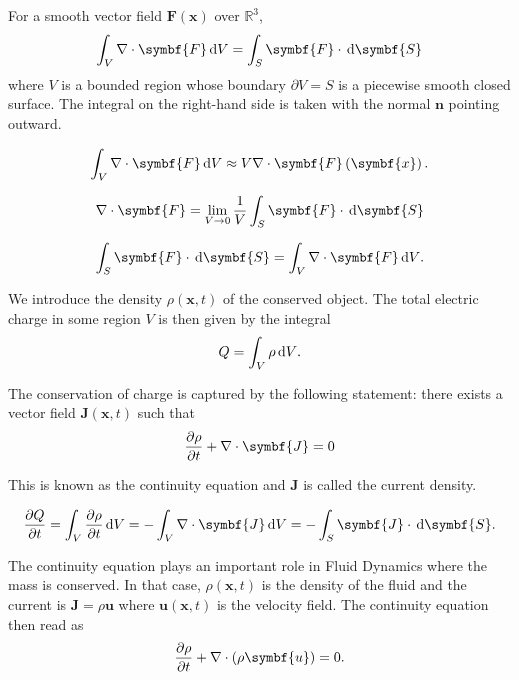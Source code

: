 For a smooth vector field $\symbf{F}\left(\symbf{x}\right)$ over $\mathbb{R}^{3}$,
\begin{equation*}
	\int_{V}\nabla\cdot\symbf{F}\dl V=
	\int_{S}\symbf{F}\cdot\dl{\symbf{S}}
\end{equation*}
where $V$ is a bounded region whose boundary $\partial V=S$ is a piecewise smooth closed surface.
The integral on the right-hand side is taken with the normal $\symbf{n}$ pointing outward.

\begin{equation*}
	\int_{V}
	\nabla\cdot\symbf{F}\dl V\approx V\nabla\cdot\symbf{F}\left(\symbf{x}\right).
\end{equation*}

\begin{equation*}
	\nabla\cdot\symbf{F}=
	\lim_{V\to0}\frac{1}{V}\int_{S}\symbf{F}\cdot\dl{\symbf{S}}
\end{equation*}

\begin{equation*}
	\int_{S}
	\symbf{F}\cdot\dl{\symbf{S}}=
	\int_{V}\nabla\cdot\symbf{F}\dl V.
\end{equation*}

We introduce the density $\rho\left(\symbf{x},t\right)$ of the conserved object.
The total electric charge in some region $V$ is then given by the integral
\begin{equation*}
	Q=
	\int_{V}\rho\dl V.
\end{equation*}

The conservation of charge is captured by the following statement:
there exists a vector field $\symbf{J}\left(\symbf{x},t\right)$ such that
\begin{equation*}
	\diffp{\rho}{t}+
	\nabla\cdot\symbf{J}=0
\end{equation*}

This is known as the continuity equation and $\symbf{J}$ is called the current density.

\begin{equation*}
	\diffp{Q}{t}=
	\int_{V}
	\diffp{\rho}{t}\dl V=
	-\int_{V}\nabla\cdot\symbf{J}\dl V=
	-\int_{S}
	\symbf{J}\cdot\dl{\symbf{S}}.
\end{equation*}

The continuity equation plays an important role in Fluid Dynamics
where the mass is conserved.
In that case, $\rho\left(\symbf{x},t\right)$ is the density
of the fluid and the current is $\symbf{J}=\rho\symbf{u}$ where
$\symbf{u}\left(\symbf{x},t\right)$ is the velocity field.
The continuity equation then read as
\begin{equation*}
	\diffp{\rho}{t}+
	\nabla\cdot\left(\rho\symbf{u}\right)=0.
\end{equation*}

